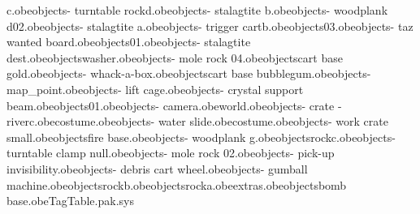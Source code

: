 c.obe objects\bank - turntable rockd.obe objects\bank - stalagtite b.obe objects\bank - woodplank d02.obe objects\bank - stalagtite a.obe objects\bank - trigger cartb.obe objects\phonebox03.obe objects\bank - taz wanted board.obe objects\phonebox01.obe objects\bank - stalagtite dest.obe objects\gp washer.obe objects\bank - mole rock 04.obe objects\gp cart base gold.obe objects\bank - whack-a-box.obe objects\gp cart base bubblegum.obe objects\bank - map_point.obe objects\bank - lift cage.obe objects\bank - crystal support beam.obe objects\chain01.obe objects\bank - camera.obe world.obe objects\bank - crate - riverc.obe costume\indywhip.obe objects\bank - water slide.obe costume\indyhat.obe objects\bank - work crate small.obe objects\cart fire base.obe objects\bank - woodplank g.obe objects\turntable rockc.obe objects\bank - turntable clamp null.obe objects\bank - mole rock 02.obe objects\bank - pick-up invisibility.obe objects\bank - debris cart wheel.obe objects\bank - gumball machine.obe objects\turntable rockb.obe objects\turntable rocka.obe extras\minecart.obe objects\cart bomb base.obe TagTable.pak.sys 